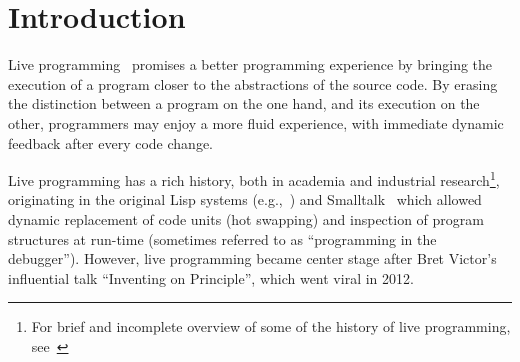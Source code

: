 \documentclass[english,submission]{programming}
\def\coolname{\textsc{LiveRec}\xspace}
\begin{document}
\begin{abstract}
  \textit{Grounding.}
  We have applied \coolname to implement probes using stack recording natively for Java through the Java Debug Interface (JDI)~\cite{JDI}, and through the DAP for Java, Python, C, and Javascript, all requiring just reasonable amounts glue code. We evaluate the run-time performance of all four probes prototypes, decomposed into: compile-after-change, hotswap, single step overhead, and stack recording overhead. Our results show that live probes on top of native debug APIs are performant enough for interactive use. In the case of DAP, it depends on characteristics of the programming language.

  \textit{Importance.} Live programming improves the programmer experience by providing immediate feedback about a program's execution and eliminating disruptive edit-compile-restart sequences. Probes are one way to shorten the programmer feedback loop at the level of functions and methods. Although probes are not new, and have been implemented in (prototype) systems, \coolname's approach of building live probes on top of existing and generic debug protocols opens up probes for a host of mainstream programming languages, with minimum effort.
\end{abstract}

\section{Introduction}
\label{sec:introduction}

Live programming~\cite{TanimotoLevels,UsableLiveProgramming,ExampleCentric,Hancock03} promises a better programming experience by bringing the execution of a program closer to the abstractions of the source code. By erasing the distinction between a program on the one hand, and its execution on the other, programmers may enjoy a more fluid experience, with immediate dynamic feedback after every code change.

Live programming has a rich history, both in academia and industrial research\footnote{For brief and incomplete overview of some of the history of live programming, see~\cite{LiveProgHist13}}, originating in the original Lisp systems (e.g.,~\cite{Sandewall78,Masinter81}) and Smalltalk~\cite{Goldberg80} which allowed dynamic replacement of code units (hot swapping) and inspection of program structures at run-time (sometimes referred to as ``programming in the debugger''). However, live programming became center stage after Bret Victor's influential talk ``Inventing on Principle'', which went viral in 2012. 
\end{document}
